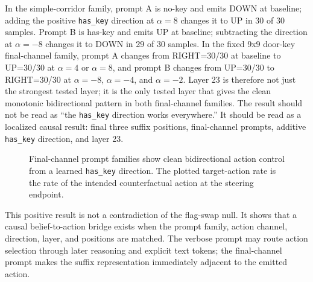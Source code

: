 \documentclass[11pt]{article}
\begin{document}
In the simple-corridor family, prompt A is no-key and emits DOWN at baseline; adding the positive \texttt{has\_key} direction at $\alpha=8$ changes it to UP in 30 of 30 samples.
Prompt B is has-key and emits UP at baseline; subtracting the direction at $\alpha=-8$ changes it to DOWN in 29 of 30 samples.
In the fixed 9x9 door-key final-channel family, prompt A changes from RIGHT=30/30 at baseline to UP=30/30 at $\alpha=4$ or $\alpha=8$, and prompt B changes from UP=30/30 to RIGHT=30/30 at $\alpha=-8$, $\alpha=-4$, and $\alpha=-2$.
Layer 23 is therefore not just the strongest tested layer; it is the only tested layer that gives the clean monotonic bidirectional pattern in both final-channel families.
The result should not be read as ``the \texttt{has\_key} direction works everywhere.''
It should be read as a localized causal result: final three suffix positions, final-channel prompts, additive \texttt{has\_key} direction, and layer 23.

\begin{figure}[t]
\centering
{}
\caption{Final-channel prompt families show clean bidirectional action control from a learned \texttt{has\_key} direction. The plotted target-action rate is the rate of the intended counterfactual action at the steering endpoint.}
\label{fig:final_channel}
\end{figure}

This positive result is not a contradiction of the flag-swap null.
It shows that a causal belief-to-action bridge exists when the prompt family, action channel, direction, layer, and positions are matched.
The verbose prompt may route action selection through later reasoning and explicit text tokens; the final-channel prompt makes the suffix representation immediately adjacent to the emitted action.
\FloatBarrier
\end{document}
